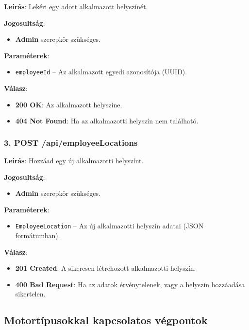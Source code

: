 \documentclass{report}[11pt]
\begin{document}
\textbf{Leírás}:  
Lekéri egy adott alkalmazott helyszínét.

\textbf{Jogosultság}:  
\begin{itemize}
    \item \textbf{Admin} szerepkör szükséges.
\end{itemize}

\textbf{Paraméterek}:  
\begin{itemize}
    \item \texttt{employeeId} – Az alkalmazott egyedi azonosítója (UUID).
\end{itemize}

\textbf{Válasz}:  
\begin{itemize}
    \item \textbf{200 OK}: Az alkalmazott helyszíne.
    \item \textbf{404 Not Found}: Ha az alkalmazotti helyszín nem található.
\end{itemize}

\subsubsection{3. POST /api/employeeLocations}

\textbf{Leírás}:  
Hozzáad egy új alkalmazotti helyszínt.

\textbf{Jogosultság}:  
\begin{itemize}
    \item \textbf{Admin} szerepkör szükséges.
\end{itemize}

\textbf{Paraméterek}:  
\begin{itemize}
    \item \texttt{EmployeeLocation} – Az új alkalmazotti helyszín adatai (JSON formátumban).
\end{itemize}

\textbf{Válasz}:  
\begin{itemize}
    \item \textbf{201 Created}: A sikeresen létrehozott alkalmazotti helyszín.
    \item \textbf{400 Bad Request}: Ha az adatok érvénytelenek, vagy a helyszín hozzáadása sikertelen.
\end{itemize}

\subsection{Motortípusokkal kapcsolatos végpontok}
\end{document}
